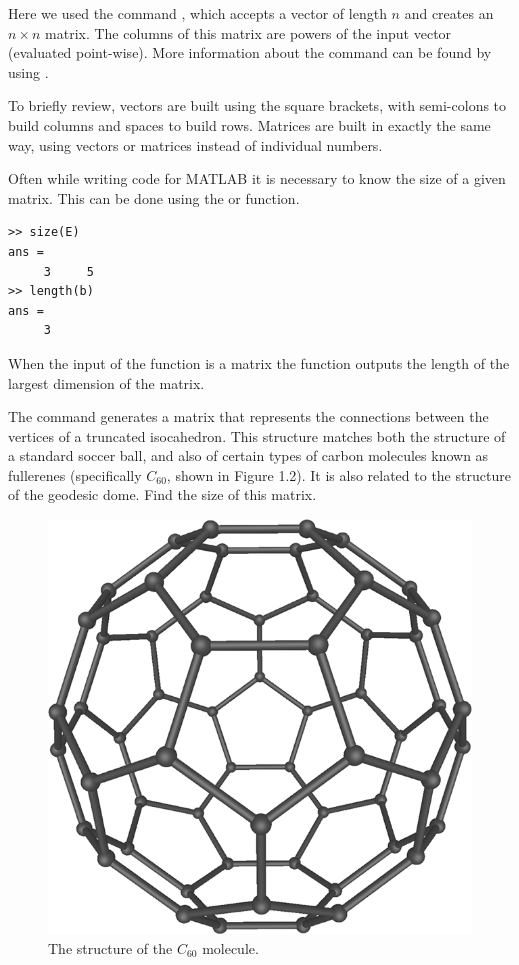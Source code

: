 Here we used the command , which accepts a vector of length $n$ and creates an $n \times n$ matrix. The columns of this matrix are powers of the input vector (evaluated point-wise). More information about the  command can be found by using . %

To briefly review, vectors are built using the square brackets, with semi-colons to build columns and spaces to build rows. Matrices are built in exactly the same way, using vectors or matrices instead of individual numbers.

Often while writing code for MATLAB it is necessary to know the size of a given matrix. This can be done using the  or  function.

\begin{lstlisting}[style=matlab]
>> size(E)
ans =
     3     5
>> length(b)
ans =
     3
\end{lstlisting}

When the input of the  function is a matrix the function outputs the length of the largest dimension of the matrix.%

\begin{problem}
The command  generates a matrix that represents the connections between the vertices of a truncated isocahedron. This structure matches both the structure of a standard soccer ball, and also of certain types of carbon molecules known as fullerenes (specifically $C_{60}$, shown in Figure 1.2). It is also related to the structure of the geodesic dome. Find the size of this matrix.
\end{problem}

\begin{figure}[h!]
\begin{center}
\includegraphics[scale = .2]{./Figures/C60a.png}
\caption{The structure of the $C_{60}$ molecule.}
\end{center}
\end{figure}


